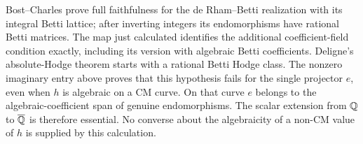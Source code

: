 Bost--Charles \cite[Theorem 3.8(1), equation (3.11), p.17]{EllBostCharles2016} prove full faithfulness for the de Rham--Betti realization with its integral Betti lattice; after inverting integers its endomorphisms have rational Betti matrices. The map just calculated identifies the additional coefficient-field condition exactly, including its version with algebraic Betti coefficients. Deligne's absolute-Hodge theorem \cite[Section 2, definitions on pp.15--16 and Main Theorem 2.11, p.19]{EllDeligne1982} starts with a rational Betti Hodge class. The nonzero imaginary entry above proves that this hypothesis fails for the single projector $e$, even when $h$ is algebraic on a CM curve. On that curve $e$ belongs to the algebraic-coefficient span of genuine endomorphisms. The scalar extension from $\mathbb Q$ to $\overline{\mathbb Q}$ is therefore essential. No converse about the algebraicity of a non-CM value of $h$ is supplied by this calculation.

